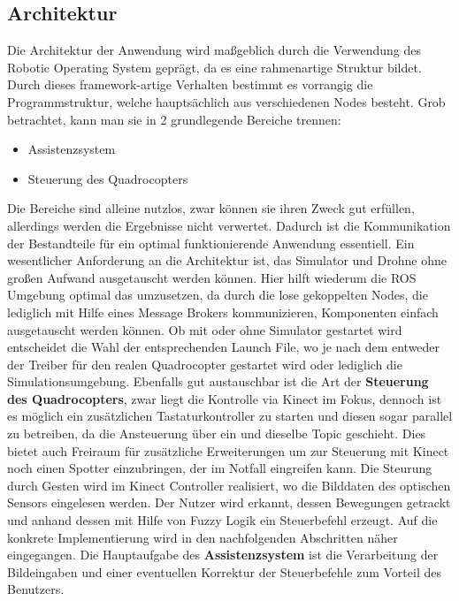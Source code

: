 \subsection{Architektur}
Die Architektur der Anwendung wird maßgeblich durch die Verwendung des Robotic Operating System geprägt, da es eine rahmenartige Struktur bildet. Durch dieses framework-artige Verhalten bestimmt es vorrangig die Programmstruktur, welche hauptsächlich aus verschiedenen Nodes besteht. Grob betrachtet, kann man sie in 2 grundlegende Bereiche trennen:
\begin{itemize}
	\item Assistenzsystem
	\item Steuerung des Quadrocopters
\end{itemize}
Die Bereiche sind alleine nutzlos, zwar können sie ihren Zweck gut erfüllen, allerdings werden die Ergebnisse nicht verwertet. Dadurch ist die Kommunikation der Bestandteile für ein optimal funktionierende Anwendung essentiell. \newline
Ein wesentlicher Anforderung an die Architektur ist, das Simulator und Drohne ohne großen Aufwand ausgetauscht werden können. Hier hilft wiederum die ROS Umgebung optimal das umzusetzen, da durch die lose gekoppelten Nodes, die lediglich mit Hilfe eines Message Brokers kommunizieren, Komponenten einfach ausgetauscht werden können. Ob mit oder ohne Simulator gestartet wird entscheidet die Wahl der entsprechenden Launch File, wo je nach dem entweder der Treiber für den realen Quadrocopter gestartet wird oder lediglich die Simulationsumgebung. Ebenfalls gut austauschbar ist die Art der \textbf{Steuerung des Quadrocopters}, zwar liegt die Kontrolle via Kinect im Fokus, dennoch ist es möglich ein zusätzlichen Tastaturkontroller zu starten und diesen sogar parallel zu betreiben, da die Ansteuerung über ein und dieselbe Topic geschieht. Dies bietet auch Freiraum für zusätzliche Erweiterungen um zur Steuerung mit Kinect noch einen Spotter einzubringen, der im Notfall eingreifen kann.\newline
Die Steurung durch Gesten wird im Kinect Controller realisiert, wo die Bilddaten des optischen Sensors eingelesen werden. Der Nutzer wird erkannt, dessen Bewegungen getrackt und anhand dessen mit Hilfe von Fuzzy Logik ein Steuerbefehl erzeugt. Auf die konkrete Implementierung wird in den nachfolgenden Abschritten näher eingegangen.\newline
Die Hauptaufgabe des \textbf{Assistenzsystem} ist die Verarbeitung der Bildeingaben und einer eventuellen Korrektur der Steuerbefehle zum Vorteil des Benutzers.
